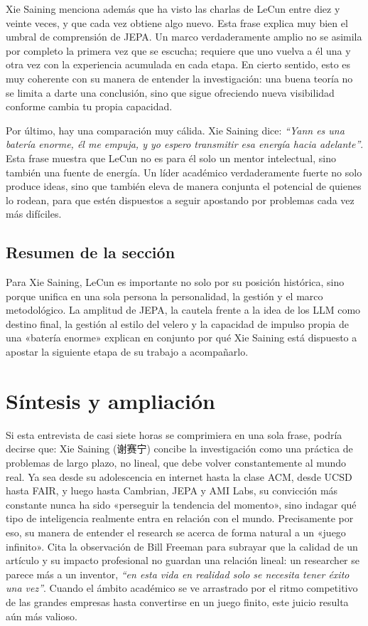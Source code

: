 \documentclass[a4paper,12pt]{article}
\begin{document}
Xie Saining menciona además que ha visto las charlas de LeCun entre diez y veinte veces, y que cada vez obtiene algo nuevo. Esta frase explica muy bien el umbral de comprensión de JEPA. Un marco verdaderamente amplio no se asimila por completo la primera vez que se escucha; requiere que uno vuelva a él una y otra vez con la experiencia acumulada en cada etapa. En cierto sentido, esto es muy coherente con su manera de entender la investigación: una buena teoría no se limita a darte una conclusión, sino que sigue ofreciendo nueva visibilidad conforme cambia tu propia capacidad.

Por último, hay una comparación muy cálida. Xie Saining dice: \textit{``Yann es una batería enorme, él me empuja, y yo espero transmitir esa energía hacia adelante''}. Esta frase muestra que LeCun no es para él solo un mentor intelectual, sino también una fuente de energía. Un líder académico verdaderamente fuerte no solo produce ideas, sino que también eleva de manera conjunta el potencial de quienes lo rodean, para que estén dispuestos a seguir apostando por problemas cada vez más difíciles.

\subsection{Resumen de la sección}

Para Xie Saining, LeCun es importante no solo por su posición histórica, sino porque unifica en una sola persona la personalidad, la gestión y el marco metodológico. La amplitud de JEPA, la cautela frente a la idea de los LLM como destino final, la gestión al estilo del velero y la capacidad de impulso propia de una «batería enorme» explican en conjunto por qué Xie Saining está dispuesto a apostar la siguiente etapa de su trabajo a acompañarlo.

\section{Síntesis y ampliación}

Si esta entrevista de casi siete horas se comprimiera en una sola frase, podría decirse que: Xie Saining (谢赛宁) concibe la investigación como una práctica de problemas de largo plazo, no lineal, que debe volver constantemente al mundo real. Ya sea desde su adolescencia en internet hasta la clase ACM, desde UCSD hasta FAIR, y luego hasta Cambrian, JEPA y AMI Labs, su convicción más constante nunca ha sido «perseguir la tendencia del momento», sino indagar qué tipo de inteligencia realmente entra en relación con el mundo. Precisamente por eso, su manera de entender el research se acerca de forma natural a un «juego infinito». Cita la observación de Bill Freeman para subrayar que la calidad de un artículo y su impacto profesional no guardan una relación lineal: un researcher se parece más a un inventor, \textit{``en esta vida en realidad solo se necesita tener éxito una vez''}. Cuando el ámbito académico se ve arrastrado por el ritmo competitivo de las grandes empresas hasta convertirse en un juego finito, este juicio resulta aún más valioso.
\end{document}
